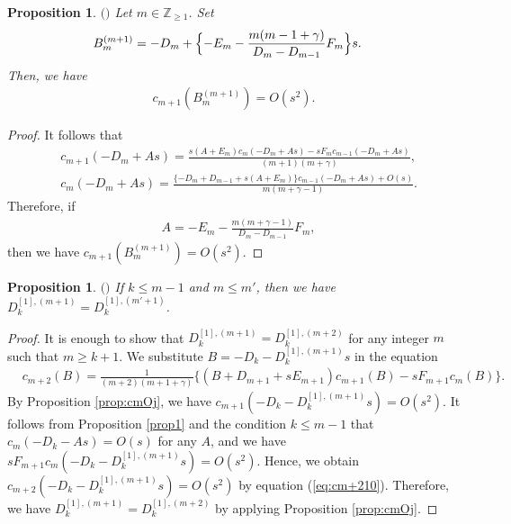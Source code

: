 \documentclass[12pt]{amsart}
\newcommand{\Zint}{\mathbb {Z}}
\numberwithin{equation}{section}
\newtheorem{prop}[thm]{Proposition}
\theoremstyle{definition}
\theoremstyle{remark}
\begin{document}
\begin{prop} $($\cite{M}$)$ \label{prop:B2}
Let $m \in \Zint _{\geq 1} $.
Set
\begin{align}
& B_{m}^{(m+1)}= -D_{m}+\Bigl\{-E_{m}-\frac{m(m-1+\gamma)}{D_{m}-D_{m- 1}}F_{m}\Bigr\}s .
\end{align}
Then, we have
\begin{align}
  c_{m+1}(B_{m}^{(m+1)})= O(s^2) . 
\end{align}
\end{prop}
\begin{proof}
It follows that
  \begin{align}
    &c_{m+1}(-D_{m} +As) = \frac{ s(A +E_{m})c_{m}(-D_{m} +As) -sF_{m} c_{m-1}(-D_{m} +As) }{(m+1)(m+\gamma)} , \\
    &c_{m}(-D_{m} +As) = \frac{\{ -D_{m} +D_{m-1} +s(A+E_{m})\}c_{m-1}(-D_{m} +As) +O(s)}{m(m +\gamma -1)} . \nonumber
  \end{align}
Therefore, if
\begin{align}
&  A= -E_{m} -\frac{m(m +\gamma -1)}{D_{m} -D_{m-1}}F_{m} ,
\end{align}  
then we have $c_{m+1}(B_{m}^{(m+1)})= O(s^2)$.
\end{proof}
\begin{prop} $($\cite{M}$)$ \label{prop:Dk1m+1}
If $k \leq m-1$ and $m \leq m' $, then we have $D_k^{[1],(m+1)} = D_k^{[1],(m'+1)}  $.
\end{prop}
\begin{proof}
It is enough to show that $D_k^{[1],(m+1)} = D_k^{[1],(m+2)}  $ for any integer $m$ such that $m  \geq k + 1  $.
We substitute $B= -D_k - D_k^{[1],(m+1)} s $ in the equation
\begin{align}
& c_{m+2} (B) = \frac{1}{(m+2)(m+1+\gamma )} \{ (B+D_{m+1} +s E_{m+1}) c_{m+1} (B) -s F_{m+1} c_{m} (B) \} .
\label{eq:cm+210}
\end{align}
By Proposition \ref{prop:cmOj}, we have $ c_{m+1} ( -D_k - D_k^{[1],(m+1)} s ) = O(s^2) $.
It follows from Proposition \ref{prop1} and the condition $k \leq m-1 $ that $c_m (-D_k -A s ) = O(s)$ for any $A$, and we have $s F_{m+1} c_{m} ( -D_k - D_k^{[1],(m+1)} s) = O(s^2)$.
Hence, we obtain $ c_{m+2} ( -D_k - D_k^{[1],(m+1)} s) = O(s^2) $ by equation (\ref{eq:cm+210}).
Therefore, we have $D_k^{[1],(m+1)} = D_k^{[1],(m+2)} $ by applying Proposition \ref{prop:cmOj}.
\end{proof}
\end{document}
